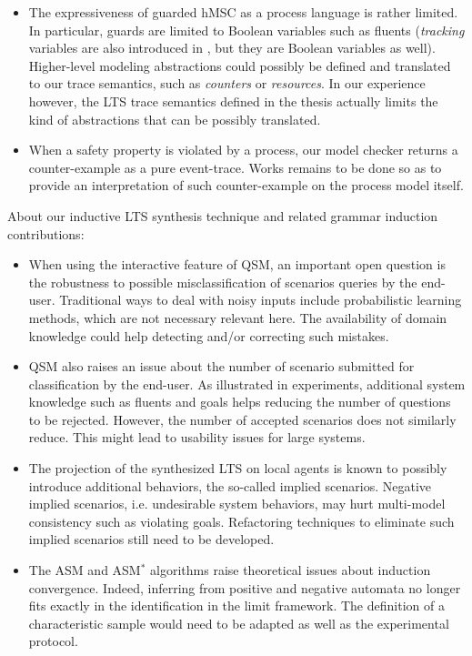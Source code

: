 \begin{itemize}

\item The expressiveness of guarded hMSC as a process language is rather limited. In particular, guards are limited to Boolean variables such as fluents (\emph{tracking} variables are also introduced in \cite{Damas:2011}, but they are Boolean variables as well). Higher-level modeling abstractions could possibly be defined and translated to our trace semantics, such as \emph{counters} or \emph{resources}. In our experience however, the LTS trace semantics defined in the thesis actually limits the kind of abstractions that can be possibly translated. 

\item When a safety property is violated by a process, our model checker returns a counter-example as a pure event-trace. Works remains to be done so as to provide an interpretation of such counter-example on the process model itself. 

\end{itemize}

About our inductive LTS synthesis technique and related grammar induction contributions:

\begin{itemize}

\item When using the interactive feature of QSM, an important open question is the robustness to possible misclassification of scenarios queries by the end-user. Traditional ways to deal with noisy inputs include probabilistic learning methods, which are not necessary relevant here. The availability of domain knowledge could help detecting and/or correcting such mistakes.

\item QSM also raises an issue about the number of scenario submitted for classification by the end-user. As illustrated in experiments, additional system knowledge such as fluents and goals helps reducing the number of questions to be rejected. However, the number of accepted scenarios does not similarly reduce. This might lead to usability issues for large systems.

\item The projection of the synthesized LTS on local agents is known to possibly introduce additional behaviors, the so-called implied scenarios. Negative implied scenarios, i.e. undesirable system behaviors, may hurt multi-model consistency such as violating goals. Refactoring techniques to eliminate such implied scenarios still need to be developed.

\item The ASM and ASM$^*$ algorithms raise theoretical issues about induction convergence. Indeed, inferring from positive and negative automata no longer fits exactly in the identification in the limit framework. The definition of a characteristic sample would need to be adapted as well as the experimental protocol.

\end{itemize}
